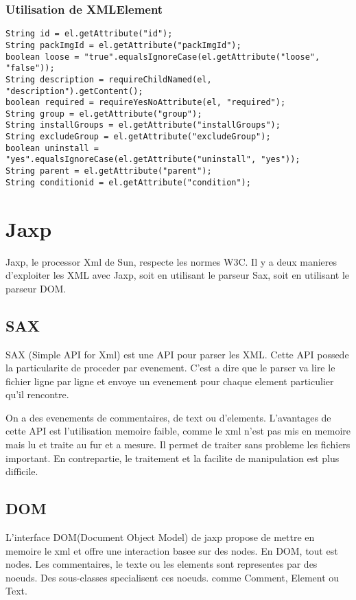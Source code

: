 \subsubsection{Utilisation de XMLElement}
\begin{verbatim}
String id = el.getAttribute("id");
String packImgId = el.getAttribute("packImgId");
boolean loose = "true".equalsIgnoreCase(el.getAttribute("loose", "false"));
String description = requireChildNamed(el, "description").getContent();
boolean required = requireYesNoAttribute(el, "required");
String group = el.getAttribute("group");
String installGroups = el.getAttribute("installGroups");
String excludeGroup = el.getAttribute("excludeGroup");
boolean uninstall = "yes".equalsIgnoreCase(el.getAttribute("uninstall", "yes"));
String parent = el.getAttribute("parent");
String conditionid = el.getAttribute("condition");
\end{verbatim}
\section{Jaxp}
Jaxp, le processor Xml de Sun, respecte les normes W3C. Il y a deux manieres d'exploiter les XML avec Jaxp, soit en utilisant le parseur Sax, soit en utilisant le parseur DOM.
\subsection{SAX}
SAX (Simple API for Xml) est une API pour parser les XML. Cette API possede la particularite de proceder par evenement. C'est a dire que le parser va lire le fichier ligne par ligne et envoye un evenement pour chaque element particulier qu'il rencontre. 

On a des evenements de commentaires, de text ou d'elements. L'avantages de cette API est l'utilisation memoire faible, comme le xml n'est pas mis en memoire mais lu et traite au fur et a mesure. Il permet de traiter sans probleme les fichiers important. En contrepartie, le traitement et la facilite de manipulation est plus difficile.
\subsection{DOM}
L'interface DOM(Document Object Model) de jaxp propose de mettre en memoire le xml et offre une interaction basee sur des nodes. En DOM, tout est nodes. Les commentaires, le texte ou les elements sont representes par des noeuds. Des sous-classes specialisent ces noeuds. comme Comment, Element ou Text.

